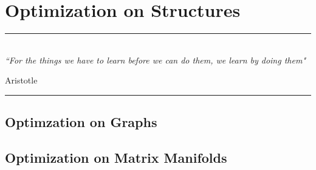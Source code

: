 
\chapter{Optimization on Structures} %
\label{Chapter5} %



\rule{\textwidth}{0.4pt} \\[0.5cm]
\textit{``For the things we have to learn before we can do them, we learn by doing them"}

\begin{flushright}
Aristotle
\end{flushright}
\rule{\textwidth}{0.4pt} 

\section{Optimzation on Graphs}

\section{Optimization on Matrix Manifolds}

